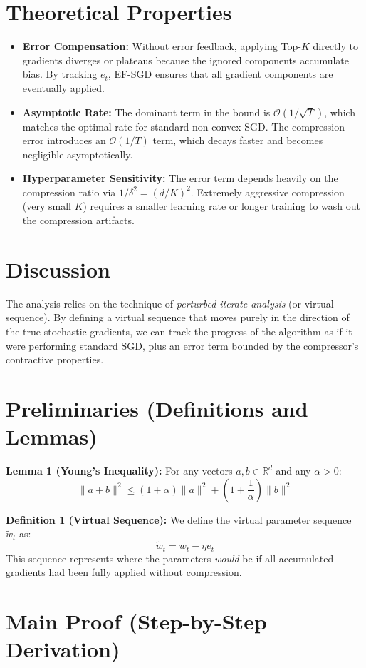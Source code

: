 \documentclass{article}
\begin{document}
\section*{Theoretical Properties}
\begin{itemize}
    \item \textbf{Error Compensation:} Without error feedback, applying Top-$K$ directly to gradients diverges or plateaus because the ignored components accumulate bias. By tracking $e_t$, EF-SGD ensures that all gradient components are eventually applied.
    \item \textbf{Asymptotic Rate:} The dominant term in the bound is $\mathcal{O}(1/\sqrt{T})$, which matches the optimal rate for standard non-convex SGD. The compression error introduces an $\mathcal{O}(1/T)$ term, which decays faster and becomes negligible asymptotically.
    \item \textbf{Hyperparameter Sensitivity:} The error term depends heavily on the compression ratio via $1/\delta^2 = (d/K)^2$. Extremely aggressive compression (very small $K$) requires a smaller learning rate or longer training to wash out the compression artifacts.
\end{itemize}

\section*{Discussion}
The analysis relies on the technique of \textit{perturbed iterate analysis} (or virtual sequence). By defining a virtual sequence that moves purely in the direction of the true stochastic gradients, we can track the progress of the algorithm as if it were performing standard SGD, plus an error term bounded by the compressor's contractive properties.

\section*{Preliminaries (Definitions and Lemmas)}
\textbf{Lemma 1 (Young's Inequality):} For any vectors $a, b \in \mathbb{R}^d$ and any $\alpha > 0$:
$$ \|a + b\|^2 \leq (1 + \alpha)\|a\|^2 + (1 + \frac{1}{\alpha})\|b\|^2 $$

\textbf{Definition 1 (Virtual Sequence):} We define the virtual parameter sequence $\tilde{w}_t$ as:
$$ \tilde{w}_t = w_t - \eta e_t $$
This sequence represents where the parameters \textit{would} be if all accumulated gradients had been fully applied without compression.

\section*{Main Proof (Step-by-Step Derivation)}
\end{document}
